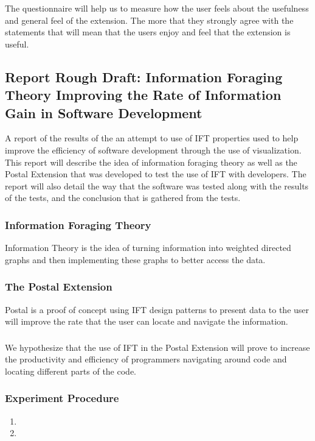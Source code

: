\documentclass[letterpaper,10pt,titlepage,draftclsnofoot,onecolumn,onesided] {IEEEtran}
\begin{document}
	The questionnaire will help us to measure how the user feels about the usefulness and general feel of the extension. 
	The more that they strongly agree with the statements that will mean that the users enjoy and feel that the extension is useful.

	\subsection{Report Rough Draft: Information Foraging Theory Improving the Rate of Information Gain in Software Development}
	A report of the results of the an attempt to use of IFT properties used to help improve the efficiency of software development through the use of visualization. This report will describe the idea of information foraging theory as well as the Postal Extension that was developed to test the use of IFT with developers. The report will also detail the way that the software was tested along with the results of the tests, and the conclusion that is gathered from the tests. 
	
	\subsubsection{Information Foraging Theory}
	Information Theory is the idea of turning information into weighted directed graphs and then implementing these graphs to better access the data.
	
	\subsubsection{The Postal Extension}
	Postal is a proof of concept using IFT design patterns to present data to the user will improve the rate that the user can locate and navigate the information.
	
	\subsubsection{}
	We hypothesize that the use of IFT in the Postal Extension will prove to increase the productivity and efficiency of programmers navigating around code and locating different parts of the code.  
	
	\subsubsection{Experiment Procedure}
	\begin{enumerate}
		\item
		\item
	\end{enumerate}
	
\end{document}
